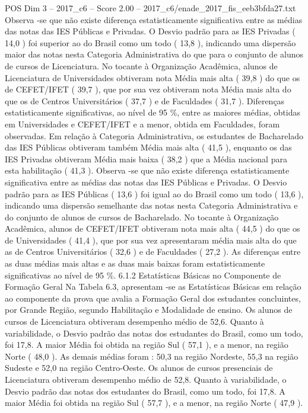 \begin{textsample}{POS Dim 3 – 2017\_c6 – Score 2.00 – 2017\_c6/enade\_2017\_fis\_eeb3bfda27.txt}
Observa -se que não existe diferença estatisticamente significativa entre as médias das notas das IES Públicas e Privadas.
O Desvio padrão para as IES Privadas ( 14,0 ) foi superior ao do Brasil como um todo ( 13,8 ), indicando uma dispersão maior das notas nesta Categoria Administrativa do que para o conjunto de alunos de cursos de Licenciatura.
No tocante à Organização Acadêmica, alunos de Licenciatura de Universidades obtiveram nota Média mais alta ( 39,8 ) do que os de CEFET/IFET ( 39,7 ), que por sua vez obtiveram nota Média mais alta do que os de Centros Universitários ( 37,7 ) e de Faculdades ( 31,7 ).
Diferenças estatisticamente significativas, ao nível de 95 \%, entre as maiores médias, obtidas em Universidades e CEFET/IFET e a menor, obtida em Faculdades, foram observadas.
Em relação à Categoria Administrativa, os estudantes de Bacharelado das IES Públicas obtiveram também Média mais alta ( 41,5 ), enquanto os das IES Privadas obtiveram Média mais baixa ( 38,2 ) que a Média nacional para esta habilitação ( 41,3 ).
Observa -se que não existe diferença estatisticamente significativa entre as médias das notas das IES Públicas e Privadas.
O Desvio padrão para as IES Públicas ( 13,6 ) foi igual ao do Brasil como um todo ( 13,6 ), indicando uma dispersão semelhante das notas nesta Categoria Administrativa e do conjunto de alunos de cursos de Bacharelado.
No tocante à Organização Acadêmica, alunos de CEFET/IFET obtiveram nota mais alta ( 44,5 ) do que os de Universidades ( 41,4 ), que por sua vez apresentaram média mais alta do que as de Centros Universitários ( 32,6 ) e de Faculdades ( 27,2 ).
As diferenças entre as duas médias mais altas e as duas mais baixas foram estatisticamente significativas ao nível de 95 \%. 6.1.2 Estatísticas Básicas no Componente de Formação Geral Na Tabela 6.3, apresentam -se as Estatísticas Básicas em relação ao componente da prova que avalia a Formação Geral dos estudantes concluintes, por Grande Região, segundo Habilitação e Modalidade de ensino.
Os alunos de cursos de Licenciatura obtiveram desempenho médio de 52,6.
Quanto à variabilidade, o Desvio padrão das notas dos estudantes do Brasil, como um todo, foi 17,8.
A maior Média foi obtida na região Sul ( 57,1 ), e a menor, na região Norte ( 48,0 ).
As demais médias foram : 50,3 na região Nordeste, 55,3 na região Sudeste e 52,0 na região Centro-Oeste.
Os alunos de cursos presenciais de Licenciatura obtiveram desempenho médio de 52,8.
Quanto à variabilidade, o Desvio padrão das notas dos estudantes do Brasil, como um todo, foi 17,8.
A maior Média foi obtida na região Sul ( 57,7 ), e a menor, na região Norte ( 47,9 ).

\end{textsample}
